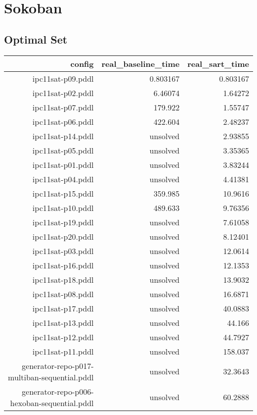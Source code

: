 \documentclass{article}
\begin{document}
                \newpage \section{Sokoban}
                    \subsection*{Optimal Set}
                    
                            \begin{center}
                            \scriptsize
                            \begin{tabular}{r|r|r}
                            config & real\_baseline\_time & real\_sart\_time\\\midrule
                             ipc11sat-p09.pddl&0.803167&0.803167\\
 ipc11sat-p02.pddl&6.46074&1.64272\\
 ipc11sat-p07.pddl&179.922&1.55747\\
 ipc11sat-p06.pddl&422.604&2.48237\\
 ipc11sat-p14.pddl&unsolved&2.93855\\
 ipc11sat-p05.pddl&unsolved&3.35365\\
 ipc11sat-p01.pddl&unsolved&3.83244\\
 ipc11sat-p04.pddl&unsolved&4.41381\\
 ipc11sat-p15.pddl&359.985&10.9616\\
 ipc11sat-p10.pddl&489.633&9.76356\\
 ipc11sat-p19.pddl&unsolved&7.61058\\
 ipc11sat-p20.pddl&unsolved&8.12401\\
 ipc11sat-p03.pddl&unsolved&12.0614\\
 ipc11sat-p16.pddl&unsolved&12.1353\\
 ipc11sat-p18.pddl&unsolved&13.9032\\
 ipc11sat-p08.pddl&unsolved&16.6871\\
 ipc11sat-p17.pddl&unsolved&40.0883\\
 ipc11sat-p13.pddl&unsolved&44.166\\
 ipc11sat-p12.pddl&unsolved&44.7927\\
 ipc11sat-p11.pddl&unsolved&158.037\\
 generator-repo-p017-multiban-sequential.pddl&unsolved&32.3643\\
 generator-repo-p006-hexoban-sequential.pddl&unsolved&60.2888\\

\end{tabular}
\end{center}
\end{document}
